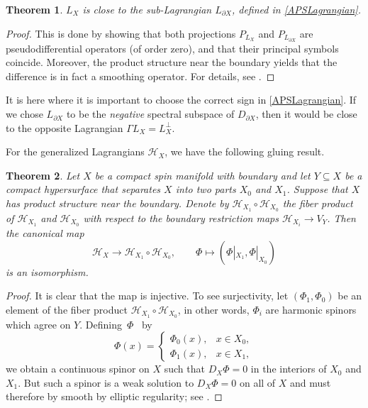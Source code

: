 \documentclass[pdftex]{sigma}
\numberwithin{equation}{section}
\newtheorem{Theorem}{Theorem}[section]
\begin{document}
\begin{Theorem}
\label{ThmClosed}
 $L_X$ is close to the sub-Lagrangian $L_{\partial X}$, defined in \eqref{APSLagrangian}.
\end{Theorem}

\begin{proof}
This is done by showing that both projections $P_{L_X}$ and $P_{L_{\partial X}}$ are pseudodifferential operators (of order zero), and that their principal symbols coincide.
Moreover, the product structure near the boundary yields that the difference is in fact a smoothing operator.
For details, see \cite[Remark~3.16]{LudewigRoos}.
\end{proof}

\begin{Remark}
It is here where it is important to choose the correct sign in \eqref{APSLagrangian}.
If we chose $L_{\partial X}$ to be the \emph{negative} spectral subspace of $D_{\partial X}$, then it would be close to the opposite Lagrangian $\Gamma L_X = L_X^\perp$.
\end{Remark}

For the generalized Lagrangians $\mathcal{H}_X$, we have the following gluing result.

\begin{Theorem} \label{TheoremFunctoriality}
Let $X$ be a compact spin manifold with boundary and let $Y \subseteq X$ be a compact hypersurface that separates $X$ into two parts $X_0$ and $X_1$.
Suppose that $X$ has product structure near the boundary.
Denote by $\mathcal{H}_{X_1} \circ \mathcal{H}_{X_0}$ the fiber product of $\mathcal{H}_{X_1}$ and $\mathcal{H}_{X_0}$ with respect to the boundary restriction maps $\mathcal{H}_{X_i} \to V_Y$.
Then the canonical map
\begin{equation*}
 \mathcal{H}_X \longrightarrow \mathcal{H}_{X_1} \circ \mathcal{H}_{X_0}, \qquad \Phi \longmapsto (\Phi|_{X_{1}}, \Phi|_{X_{0}})
\end{equation*}
is an isomorphism.
\end{Theorem}

\begin{proof}
It is clear that the map is injective.
To see surjectivity, let $(\Phi_{1}, \Phi_{0})$ be an element of the fiber product $\mathcal{H}_{X_{1}} \circ \mathcal{H}_{X_{0}}$, in other words, $\Phi_{i}$ are harmonic spinors which agree on $Y$.
Defining~$\Phi$~ by
\begin{equation*}
 \Phi(x) = \begin{cases} \Phi_{0}(x), & x \in X_{0}, \\ \Phi_{1}(x), & x \in X_{1}, \end{cases}
\end{equation*}
we obtain a continuous spinor on $X$ such that $D_X \Phi = 0$ in the interiors of $X_{0}$ and $X_{1}$.
But such a spinor is a weak solution to $D_X \Phi = 0$ on all of $X$ and must therefore by smooth by elliptic regularity; see \cite[Lemma 3.15]{LudewigRoos}.
\end{proof}
\end{document}
